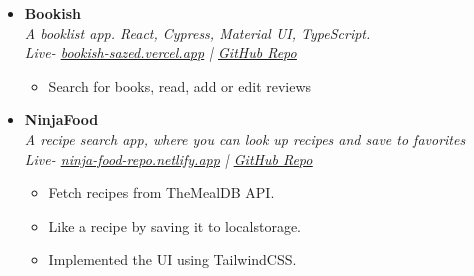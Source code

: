 \documentclass[11pt, oneside, a4paper, titlepage]{article}
\newcommand\experienceVSpace{\vspace{-0.1cm}}
\begin{document}
\begin{tcolorbox}
\begin{minipage}[t]{11cm}
\begin{tcolorbox}[grow to right by=0.75cm,colframe=white,colback=white]
\begin{itemize}
        \item
        {
          \textbf{Bookish} \\
          \textit{A booklist app. React, Cypress, Material UI, TypeScript.} \\
          \textit{Live- \href{https://bookish-sazed.vercel.app}{\underline{bookish-sazed.vercel.app}} | \href{https://github.com/SazedWorldbringer/bookish}{\underline{GitHub Repo}}} \\
          \vspace*{-0.7cm}
          \begin{itemize}
            \item Search for books, read, add or edit reviews
          \end{itemize}
        }

        \item
        {
          \textbf{NinjaFood} \\
          \textit{A recipe search app, where you can look up recipes and save to favorites} \\
          \textit{Live- \href{https://ninja-food-repo.netlify.app}{\underline{ninja-food-repo.netlify.app}} | \href{https://github.com/SazedWorldbringer/ninjafood}{\underline{GitHub Repo}}} \\
          \vspace*{-0.7cm}
          \begin{itemize}
            \item Fetch recipes from TheMealDB API.
              \experienceVSpace
            \item Like a recipe by saving it to localstorage.
              \experienceVSpace
            \item Implemented the UI using TailwindCSS.
          \end{itemize}
        }
      \end{itemize}

\end{tcolorbox}
\end{minipage}
\end{tcolorbox}
\end{document}
